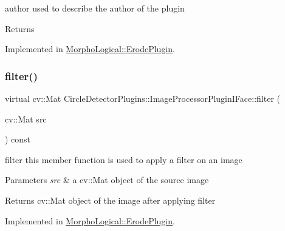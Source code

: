 author used to describe the author of the plugin 

\begin{DoxyReturn}{Returns}

\end{DoxyReturn}


Implemented in \hyperlink{class_morpho_logical_1_1_erode_plugin_a5cd6e9ed96ec99a9586952e70f2a43b5}{Morpho\+Logical\+::\+Erode\+Plugin}.

\mbox{\label{class_circle_detector_plugins_1_1_image_processor_plugin_i_face_a87e2023aca6dffc2ceace999b7ca6b0b}} 
\subsubsection{\texorpdfstring{filter()}{filter()}}
{\footnotesize\ttfamily virtual cv\+::\+Mat Circle\+Detector\+Plugins\+::\+Image\+Processor\+Plugin\+I\+Face\+::filter (\begin{DoxyParamCaption}\item[{cv\+::\+Mat}]{src }\end{DoxyParamCaption}) const\hspace{0.3cm}{\ttfamily [pure virtual]}}



filter this member function is used to apply a filter on an image 


\begin{DoxyParams}{Parameters}
{\em src} & a cv\+::\+Mat object of the source image \\
\hline
\end{DoxyParams}
\begin{DoxyReturn}{Returns}
cv\+::\+Mat object of the image after applying filter 
\end{DoxyReturn}


Implemented in \hyperlink{class_morpho_logical_1_1_erode_plugin_adaf5cef6022e87b1facd95063c92a2dc}{Morpho\+Logical\+::\+Erode\+Plugin}.

\mbox{\label{class_circle_detector_plugins_1_1_image_processor_plugin_i_face_a5003fd77a4bb84befee299528241d4e5}} 
